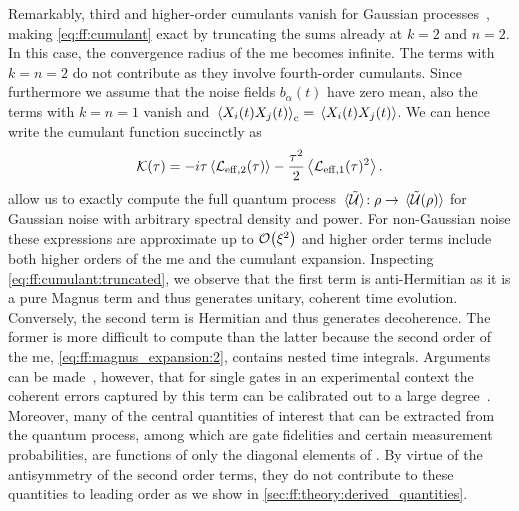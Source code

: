 Remarkably, third and higher-order cumulants vanish for Gaussian processes~\cite{Kubo1963,Szankowski2017}, making \cref{eq:ff:cumulant} exact by truncating the sums already at $k = 2$ and $n = 2$.
In this case, the convergence radius of the \gls{me} becomes infinite.
The terms with $k = n = 2$ do not contribute as they involve fourth-order cumulants.
Since furthermore we assume that the noise fields $b_\alpha(t)$ have zero mean, also the terms with $k = n = 1$ vanish and $\ev*{X_i(t)X_j(t)}_\mr{c}  =  \ev*{X_i(t)X_j(t)}$.
We can hence write the cumulant function succinctly as
\begin{equation}
    \cumulantfun(\tau) = - \i\tau\ev{\Li_{\mr{eff},2}(\tau)} - \frac{\tau^2}{2}\ev{\Li_{\mr{eff},1}(\tau)^2}  \label{eq:ff:cumulant:truncated}.
\end{equation}
 allow us to exactly compute the full quantum process $\ev*{\liouvUe}\!: \rho\rightarrow\ev*{\liouvUe(\rho)}$ for Gaussian noise with arbitrary spectral density and power.
For non-Gaussian noise these expressions are approximate up to $\order{\xi^2}$ and higher order terms include both higher orders of the \gls{me} and the cumulant expansion.
Inspecting \cref{eq:ff:cumulant:truncated}, we observe that the first term is anti-Hermitian as it is a pure Magnus term
and thus generates unitary, coherent time evolution.
Conversely, the second term is Hermitian and thus generates decoherence.
The former is more difficult to compute than the latter because the second order of the \gls{me}, \cref{eq:ff:magnus_expansion:2}, contains nested time integrals.
Arguments can be made~\cite{Cerfontaine2021}, however, that for single gates in an experimental context the coherent errors captured by this term can be calibrated out to a large degree~\cite{Cerfontaine2020a,Kimmel2015}.
Moreover, many of the central quantities of interest that can be extracted from the quantum process, among which are gate fidelities and certain measurement probabilities, are functions of only the diagonal elements of \cumulantfun.
By virtue of the antisymmetry of the second order terms, they do not contribute to these quantities to leading order as we show in \cref{sec:ff:theory:derived_quantities}.

